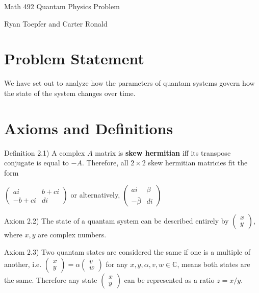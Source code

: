 \documentclass[10pt]{article}
\begin{document}
\begin{center}\Large Math 492 Quantam Physics Problem\end{center}
\begin{center}\large Ryan Toepfer and Carter Ronald\end{center}

\section{Problem Statement}
We have set out to analyze how the parameters of quantam systems govern how the state of the system changes over time.

\section{Axioms and Definitions}

Definition 2.1) A complex $A$ matrix is \textbf{skew hermitian} iff its transpose conjugate is equal to $-A$.
Therefore, all $2\times2$ skew hermitian matricies fit the form
\begin{center}
$\begin{pmatrix}ai&b+ci\\-b+ci&di\end{pmatrix}$
or alternatively, 
$\begin{pmatrix}ai&\beta\\-\bar\beta&di\end{pmatrix}$
\end{center}

Axiom 2.2) The state of a quantam system can be described entirely by $\begin{pmatrix}x\\y\end{pmatrix}$, where $x,y$ are complex numbers. 

Axiom 2.3) Two quantam states are considered the same if one is a multiple of another, i.e. $\begin{pmatrix}x\\y\end{pmatrix}=\alpha\begin{pmatrix}v\\w\end{pmatrix}$ for any $x,y,\alpha,v,w\in\mathbb C$, means both states are the same.
Therefore any state $\begin{pmatrix}x\\y\end{pmatrix}$ can be represented as a ratio $z=x/y$.
\end{document}
